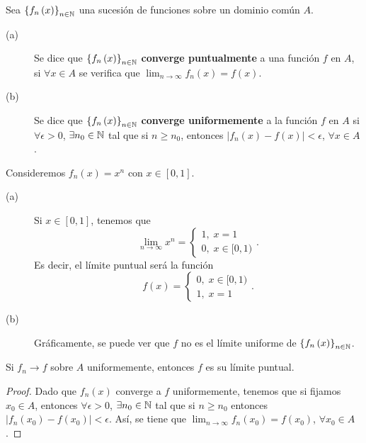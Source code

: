 \begin{fdefinition}
\normalfont Sea $\displaystyle \left\{ f_{n}\left(x\right)\right\} _{n\in\mathbb{N}} $ una sucesión de funciones sobre un dominio común $\displaystyle A $.
\begin{description}
	\item[(a)] Se dice que $\displaystyle \left\{ f_{n}\left(x\right)\right\} _{n\in\mathbb{N}} $ \textbf{converge puntualmente} a una función $\displaystyle f $ en $\displaystyle A $, si $\displaystyle \forall x \in A $ se verifica que $\displaystyle \lim_{n \to \infty}f_{n}\left(x\right)=f\left(x\right) $.
	\item[(b)] Se dice que $\displaystyle \left\{ f_{n}\left(x\right)\right\} _{n\in\mathbb{N}} $ \textbf{converge uniformemente} a la función $\displaystyle f $ en $\displaystyle A $ si $\displaystyle \forall \epsilon > 0 $, $\displaystyle \exists n_{0} \in \mathbb{N} $ tal que si $\displaystyle n \geq n_{0} $, entonces $\displaystyle \left|f_{n}\left(x\right)-f\left(x\right)\right| < \epsilon $, $\displaystyle \forall x \in A $.
\end{description}
\end{fdefinition}
\begin{eg}
	\normalfont Consideremos $\displaystyle f_{n}\left(x\right) = x^{n} $ con $\displaystyle x \in \left[0,1\right]  $.
	\begin{description}
	\item[(a)] Si $\displaystyle x \in \left[0,1\right]  $, tenemos que  
		\[ \displaystyle \lim_{n \to \infty}x^{n} =
		\begin{cases}
		1, \; x = 1 \\
		0, \; x \in [0,1)
		\end{cases}
		.\]
	Es decir, el límite puntual será la función 
		\[f\left(x\right) = 
		\begin{cases}
		0, \; x \in [0,1) \\
		1, \; x = 1
		\end{cases}
		.\]
	\item[(b)] Gráficamente, se puede ver que $\displaystyle f $ no es el límite uniforme de $\displaystyle \left\{ f_{n}\left(x\right)\right\} _{n\in\mathbb{N}} $. 
	\end{description}
\end{eg}
\begin{fprop}[]
\normalfont Si $\displaystyle f_{n} \to f $ sobre $\displaystyle A $ uniformemente, entonces $\displaystyle f $ es su límite puntual.
\end{fprop}
\begin{proof}
Dado que $\displaystyle f_{n}\left(x\right) $ converge a $\displaystyle f $ uniformemente, tenemos que si fijamos $\displaystyle x_{0} \in A $, entonces $\displaystyle \forall \epsilon > 0 $, $\displaystyle \exists n_{0} \in \mathbb{N} $ tal que si $\displaystyle  n \geq n_{0} $ entonces $\displaystyle \left|f_{n}\left(x_{0}\right)-f\left(x_{0}\right)\right| < \epsilon  $. Así, se tiene que $\displaystyle \lim_{n \to \infty}f_{n}\left(x_{0}\right) = f\left(x_{0}\right) $, $\displaystyle \forall x_{0} \in A $.
\end{proof}
